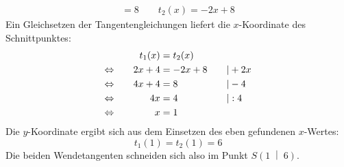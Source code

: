 \begin{exercise}
\begin{equation*}
\begin{split}
           =8
        \qquad
        t_2(x)=-2x+8
      \end{split}
    \end{equation*}
    Ein Gleichsetzen der Tangentengleichungen liefert
    die $x$-Koordinate des Schnittpunktes:
    \begin{alignat*}{3}
      \relax&\quad
      &
      t_1(x)&=t_2(x)
      &
      \quad&\relax
      \\
      \Leftrightarrow&\quad
      &
      2x+4&=-2x+8
      &
      \quad&|+2x
      \\
      \Leftrightarrow&\quad
      &
      4x+4&=8
      &
      \quad&|-4
      \\
      \Leftrightarrow&\quad
      &
      4x&=4
      &
      \quad&|:4
      \\
      \Leftrightarrow&\quad
      &
      x&=1
      &
      \quad&\relax
    \end{alignat*}
    Die $y$-Koordinate ergibt sich aus dem
    Einsetzen des eben gefundenen $x$-Wertes:
    \begin{equation*}
      t_{1}(1)=t_2(1)=6
    \end{equation*}
    Die beiden Wendetangenten schneiden sich also
    im Punkt $S\left(1\;\middle|\;6\right)$.
  \fi
\end{exercise}
